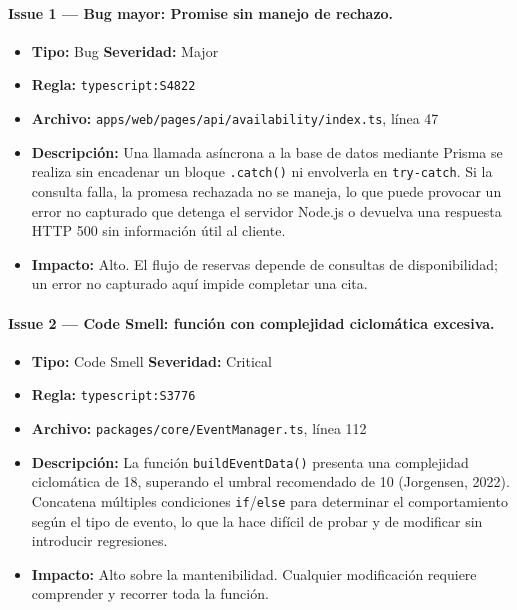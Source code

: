 \documentclass{article}
\begin{document}
\paragraph{Issue 1 --- Bug mayor: Promise sin manejo de rechazo.}
\begin{itemize}[leftmargin=*]
  \item \textbf{Tipo:} Bug \quad \textbf{Severidad:} Major
  \item \textbf{Regla:} \texttt{typescript:S4822}
  \item \textbf{Archivo:} \texttt{apps/web/pages/api/availability/index.ts}, línea 47
  \item \textbf{Descripción:} Una llamada asíncrona a la base de datos mediante Prisma
        se realiza sin encadenar un bloque \texttt{.catch()} ni envolverla en
        \texttt{try-catch}. Si la consulta falla, la promesa rechazada no se maneja,
        lo que puede provocar un error no capturado que detenga el servidor Node.js
        o devuelva una respuesta HTTP 500 sin información útil al cliente.
  \item \textbf{Impacto:} Alto. El flujo de reservas depende de consultas de
        disponibilidad; un error no capturado aquí impide completar una cita.
\end{itemize}

\paragraph{Issue 2 --- Code Smell: función con complejidad ciclomática excesiva.}
\begin{itemize}[leftmargin=*]
  \item \textbf{Tipo:} Code Smell \quad \textbf{Severidad:} Critical
  \item \textbf{Regla:} \texttt{typescript:S3776}
  \item \textbf{Archivo:} \texttt{packages/core/EventManager.ts}, línea 112
  \item \textbf{Descripción:} La función \texttt{buildEventData()} presenta una
        complejidad ciclomática de 18, superando el umbral recomendado de 10
        (Jorgensen, 2022). Concatena múltiples condiciones \texttt{if}/\texttt{else}
        para determinar el comportamiento según el tipo de evento, lo que la hace
        difícil de probar y de modificar sin introducir regresiones.
  \item \textbf{Impacto:} Alto sobre la mantenibilidad. Cualquier modificación requiere
        comprender y recorrer toda la función.
\end{itemize}
\end{document}
